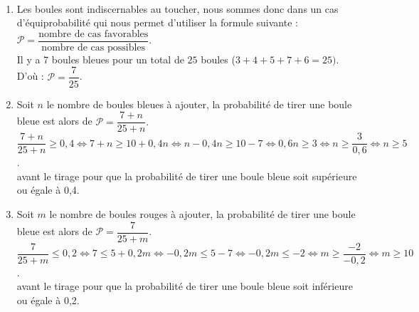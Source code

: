 \ \\ [-5mm]
\begin{enumerate}
   \item Les boules sont indiscernables au toucher, nous sommes donc dans un cas d'équiprobabilité qui nous permet d'utiliser la formule suivante : $\mathcal{P} =\dfrac{\text{nombre de cas favorables}}{\text{nombre de cas possibles}}$. \\
   Il y a 7 boules bleues pour un total de $25$ boules ($3+4+5+7+6 =25)$. D'où : $\mathcal{P} =\dfrac{7}{25}$. \\
   \item Soit $n$ le nombre de boules bleues à ajouter, la probabilité de tirer une boule bleue est alors de $\mathcal{P} =\dfrac{7+n}{25+n}.$ \\
   $\dfrac{7+n}{25+n} \geqslant 0,4 \iff
      7+n \geqslant 10+0,4n \iff
      n-0,4n \geqslant 10-7 \iff
      0,6n \geqslant 3 \iff
      n \geqslant \dfrac{3}{0,6} \iff
      n \geqslant 5$. \\ [1mm]
    avant le tirage pour que la probabilité de tirer une boule bleue soit supérieure ou égale à 0,4.
   \item Soit $m$ le nombre de boules rouges à ajouter, la probabilité de tirer une boule bleue est alors de $\mathcal{P} =\dfrac{7}{25+m}.$  \\
   $\dfrac{7}{25+m} \leqslant 0,2 \iff
    7 \leqslant 5+0,2m \iff
    -0,2m \leqslant 5-7 \iff
    -0,2m \leqslant -2 \iff
    m \geqslant \dfrac{-2}{-0,2} \iff
    m \geqslant 10$. \\ [1mm]
    avant le tirage pour que la probabilité de tirer une boule bleue soit inférieure ou égale à 0,2.
\end{enumerate}
